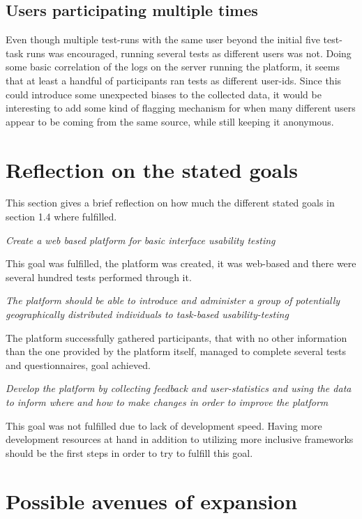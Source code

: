   \subsection{Users participating multiple times}

  Even though multiple test-runs with the same user beyond the initial five
  test-task runs was encouraged, running several tests as different users was
  not. Doing some basic correlation of the logs on the server running the
  platform, it seems that at least a handful of participants ran tests as
  different user-ids. Since this could introduce some unexpected biases to the
  collected data, it would be interesting to add some kind of flagging
  mechanism for when many different users appear to be coming from the same
  source, while still keeping it anonymous.

\section{Reflection on the stated goals}

	This section gives a brief reflection on how much the different stated goals
	in section 1.4 where fulfilled.

	\textit{Create a web based platform for basic interface usability testing}

	This goal was fulfilled, the platform was created, it was web-based and there
	were several hundred tests performed through it.

	\textit{The platform should be able to introduce and administer a group of
	potentially geographically distributed individuals to task-based
	usability-testing}

	The platform successfully gathered participants, that with no other
	information than the one provided by the platform itself, managed to complete
	several tests and questionnaires, goal achieved.

	\textit{Develop the platform by collecting feedback and user-statistics and
	using the data to inform where and how to make changes in order to improve
	the platform}

	This goal was not fulfilled due to lack of development speed. Having more
	development resources at hand in addition to utilizing more inclusive
	frameworks should be the first steps in order to try to fulfill this goal.

\section{Possible avenues of expansion}

